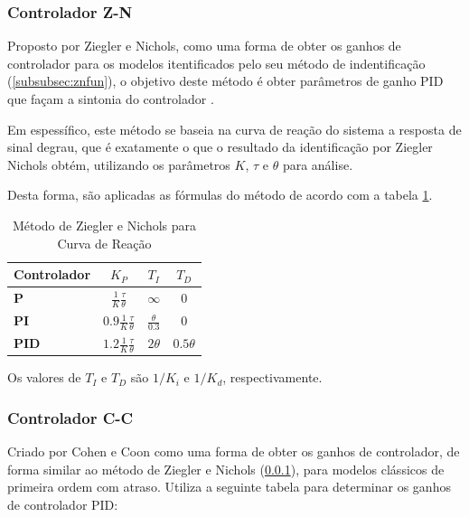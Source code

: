 \subsubsection{Controlador Z-N}\label{subsubsec:znctr}

Proposto por Ziegler e Nichols, como uma forma de obter os ganhos de controlador para os modelos itentificados
pelo seu método de indentificação (\ref{subsubsec:znfun}), o objetivo deste método é obter parâmetros de ganho PID que
façam a sintonia do controlador \cite{apostpidsint}.

Em espessífico, este método se baseia na curva de reação do sistema a resposta de sinal degrau, que é
exatamente o que o resultado da identificação por Ziegler Nichols obtém, utilizando os parâmetros $K$, $\tau$ e $\theta$
para análise.

Desta forma, são aplicadas as fórmulas do método de acordo com a tabela \ref{tab:zncntb}.

\begin{table}[h]
    \begin{center}
        \begin{tabular}{ | l | c | c | c | }
            \hline
            {\textbf{Controlador}} & {$K_P$}                               & {$T_I$}                & {$T_D$}       \\
            \hline
            {\textbf{P}}           & {$\frac{1}{K}\frac{\tau}{\theta}$}    & {$\infty$}             & {$0$}         \\
            \hline
            {\textbf{PI}}          & {$0.9\frac{1}{K}\frac{\tau}{\theta}$} & {$\frac{\theta}{0.3}$} & {$0$}         \\
            \hline
            {\textbf{PID}}         & {$1.2\frac{1}{K}\frac{\tau}{\theta}$} & {$2\theta$}            & {$0.5\theta$} \\
            \hline
        \end{tabular}
        \caption{Método de Ziegler e Nichols para Curva de Reação}
        \label{tab:zncntb}
    \end{center}
\end{table}

Os valores de $T_I$ e $T_D$ são $1/K_i$ e $1/K_d$, respectivamente.

\subsubsection{Controlador C-C}\label{subsubsec:ccapx}

Criado por Cohen e Coon como uma forma de obter os ganhos de controlador, de forma similar ao método de Ziegler e Nichols
(\ref{subsubsec:znctr}), para modelos clássicos de primeira ordem com atraso.
Utiliza a seguinte tabela para determinar os ganhos de controlador PID:

